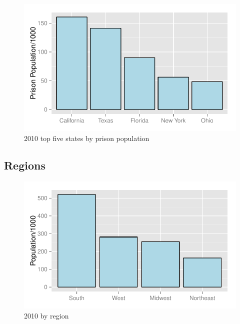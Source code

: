 \documentclass[letterpaper, landscape]{article}
\begin{document}
  \begin{figure}[H]
    \centering
    \includegraphics[scale = 0.8]{figures/top_five_2010.pdf}
    \caption{2010 top five states by prison population}
  \end{figure}

  \subsection{Regions}
  \begin{figure}[H]
    \centering
    \includegraphics[scale = 0.8]{figures/regions_2010.pdf}
    \caption{2010 by region}
  \end{figure}
\end{document}
